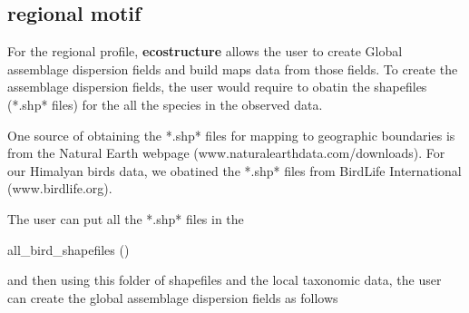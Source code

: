 \documentclass[12pt]{article}
\begin{document}
\subsection{regional motif}

For the regional profile, \textbf{ecostructure} allows the user to create Global assemblage dispersion fields and build maps data from those fields. To create the assemblage dispersion fields, the user would require to obatin the shapefiles (*.shp* files) for the all the species in the observed data.

One source of obtaining the *.shp* files for mapping to geographic boundaries is from the Natural Earth webpage (www.naturalearthdata.com/downloads). For our Himalyan birds data, we obatined the *.shp* files from BirdLife International (www.birdlife.org).

The user can put all the *.shp* files in the \begin{verb} all_bird_shapefiles () \end{verb} and then using this folder of shapefiles and the local taxonomic data, the user can create the global assemblage dispersion fields as follows

\begin{knitrout}
\color{fgcolor}\begin{kframe}
\begin{alltt}
 \hlkwb{<-} 
               \hlstd{=} \hlstd{)}
\end{alltt}
\end{kframe}
\end{knitrout}


\begin{knitrout}
\color{fgcolor}\begin{kframe}
\begin{alltt}
 \hlkwb{<-} \hlstd{(}\hlstd{(}\hlstd{,}
                    \hlstd{,}  \hlstd{=} \hlstd{))}
 \hlkwb{<-} \hlstd{(}\hlstd{)}
 \hlkwb{<-} \hlstd{(}\hlstd{(}\hlstd{,}
         \hlstd{,}
           \hlstd{=} \hlstd{),} 
\hlstd{(} \hlstd{=} \hlstd{(}\hlstd{,}\hlstd{))}
 \hlkwb{<-} 
\end{alltt}
\end{kframe}
\end{knitrout}
\end{document}
